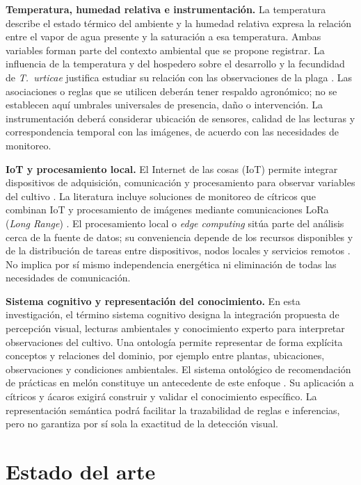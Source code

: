 \textbf{Temperatura, humedad relativa e instrumentación.}
La temperatura describe el estado térmico del ambiente y la humedad relativa
expresa la relación entre el vapor de agua presente y la saturación a esa
temperatura. Ambas variables forman parte del contexto ambiental que se propone
registrar. La influencia de la temperatura y del hospedero sobre el desarrollo
y la fecundidad de \textit{T.~urticae} justifica estudiar su relación con las
observaciones de la plaga \cite{praslicka2004}. Las asociaciones o reglas que
se utilicen deberán tener respaldo agronómico; no se establecen aquí umbrales
universales de presencia, daño o intervención. La instrumentación deberá
considerar ubicación de sensores, calidad de las lecturas y correspondencia
temporal con las imágenes, de acuerdo con las necesidades de monitoreo.

\textbf{IoT y procesamiento local.}
El Internet de las cosas (IoT) permite integrar dispositivos de adquisición,
comunicación y procesamiento para observar variables del cultivo
\cite{senoo2023iot}. La literatura incluye soluciones de monitoreo de cítricos
que combinan IoT y procesamiento de imágenes mediante comunicaciones LoRa
(\textit{Long Range}) \cite{quispe2024lora}. El procesamiento local o
\textit{edge computing} sitúa parte del análisis cerca de la fuente de datos;
su conveniencia depende de los recursos disponibles y de la distribución de
tareas entre dispositivos, nodos locales y servicios remotos \cite{yu2025}.
No implica por sí mismo independencia energética ni eliminación de todas las
necesidades de comunicación.

\textbf{Sistema cognitivo y representación del conocimiento.}
En esta investigación, el término sistema cognitivo designa la integración
propuesta de percepción visual, lecturas ambientales y conocimiento experto
para interpretar observaciones del cultivo. Una ontología permite representar
de forma explícita conceptos y relaciones del dominio, por ejemplo entre
plantas, ubicaciones, observaciones y condiciones ambientales. El sistema
ontológico de recomendación de prácticas en melón constituye un antecedente
de este enfoque \cite{umar2024ontology}. Su aplicación a cítricos y ácaros
exigirá construir y validar el conocimiento específico. La representación
semántica podrá facilitar la trazabilidad de reglas e inferencias, pero no
garantiza por sí sola la exactitud de la detección visual.

\section{Estado del arte}
\label{sec:estado-del-arte}

